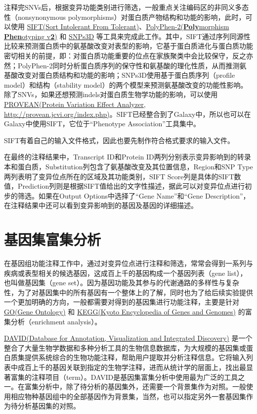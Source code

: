 注释完SNVs后，根据变异功能类别进行筛选，一般重点关注编码区的非同义多态性（nonsynonymous polymorphisms）对蛋白质产物结构和功能的影响，此时，可以使用 \href{http://sift.jcvi.org/}{SIFT(Sort Intolerant From Tolerant)}、\href{http://genetics.bwh.harvard.edu/pph2/index.shtml}{PolyPhen-2(\textbf{Poly}morphism \textbf{Phen}otyping v\textbf{2})} 和 \href{http://www.snps3d.org/}{SNPs3D} 等工具来完成此工作。其中，SIFT通过序列同源性比较来预测蛋白质中的氨基酸改变对表型的影响，它基于蛋白质进化与蛋白质功能密切相关的前提，即：对蛋白质功能重要的位点在家族聚类中会比较保守，反之亦然；PolyPhen-2同时分析蛋白质序列的保守性和氨基酸的理化性质，从而推测氨基酸改变对蛋白质结构和功能的影响；SNPs3D使用基于蛋白质序列（profile model）和结构（stability model）的两个模型来预测氨基酸改变的功能性影响。除了SNVs，如果还想预测indels对蛋白质生物学功能的影响，可以使用 \href{http://provean.jcvi.org/index.php}{PROVEAN(Protein Variation Effect Analyzer, http://provean.jcvi.org/index.php)}。SIFT已经整合到了Galaxy中，所以也可以在Galaxy中使用SIFT，它位于“Phenotype Association”工具集中。

SIFT有着自己的输入文件格式，因此也要先制作符合格式要求的输入文件。

在最终的注释结果中，Transcript ID和Protein ID两列分别表示变异影响到的转录本和蛋白质，Substitution列包含了氨基酸改变及其位置信息，Region和SNP Type两列表明了变异位点所在的区域及其功能类别，SIFT Score列是具体的SIFT数值，Prediction列则是根据SIFT值给出的文字性描述，据此可以对变异位点进行初步的筛选。如果在Output Options中选择了“Gene Name”和“Gene Description”，在注释结果中还可以看到变异影响到的基因及基因的详细描述。

\section{基因集富集分析}
在基因组功能注释工作中，通过对变异位点进行注释和筛选，常常会得到一系列与疾病或表型相关的候选基因，这成百上千的基因构成一个基因列表（gene list），也叫做基因集（gene set）。因为基因功能及其参与的代谢通路的多样性与复杂性，为了对基因集中的所有基因有一个整体上的了解，同时也为了给后续实验提供一个更加明确的方向，一般都需要对得到的基因集进行功能注释，主要是针对 \href{http://www.geneontology.org}{GO(Gene Ontology)} 和 \href{http://www.genome.jp/kegg}{KEGG(Kyoto Encyclopedia of Genes and Genomes)} 的富集分析（enrichment analysis）。

\href{http://david.abcc.ncifcrf.gov/}{DAVID(Database for Annotation, Visualization and Integrated Discovery)} 是一个整合了大量生物学数据和多种分析工具的生物信息数据库，为大规模的基因集或蛋白质集提供系统综合的生物功能注释，帮助用户提取并分析注释信息。它将输入列表中成百上千的基因关联到指定的生物学注释，进而从统计学的层面上，找出最显著富集的注释项目（term）。DAVID是基因集富集分析中使用最为广泛的工具之一。在富集分析中，除了待分析的基因集外，还需要一个背景集作为对照。一般使用相应物种基因组中的全部基因作为背景集，当然，也可以指定另外一套基因集作为待分析基因集的对照。

